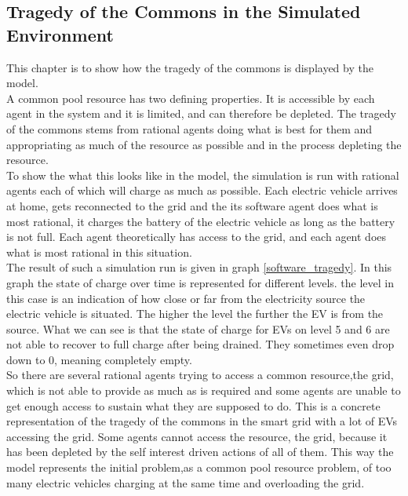 \documentclass[a4paper]{article}
\begin{document}
\subsection{Tragedy of the Commons in the Simulated Environment}
This chapter is to show how 
the tragedy of the commons is displayed by the model. \\
A common pool resource has two defining properties. It is accessible by each agent in the system and it is limited, and can 
therefore be depleted. The tragedy of the commons stems from rational agents doing what is best for them and 
appropriating as much of the resource as possible and in the process depleting the resource. \\
To show the what this looks like in the model, the simulation is run with rational agents each of which will charge 
as much as possible. Each electric vehicle arrives at home, gets reconnected to the grid and the its software agent 
does what is most rational, it charges the battery of the electric vehicle as long as the battery is not full. Each agent theoretically 
has access to the grid, and each agent does what is most rational in this situation. \\
The result of such a simulation run is given in graph \ref{software_tragedy}. In this graph the state of charge over 
time is 
represented for different levels. the level in this case is an indication of how close or far from the 
electricity source the electric vehicle is situated. The higher the level the further the EV is from the source. 
What we can see is that the state of charge for EVs on level 5 and 6 are not able to recover to full charge after being 
drained. They sometimes even drop down to 0, meaning completely empty.\\
So there are several rational agents trying to access a common resource,the grid, which is not able to provide as much 
as is required and some agents are unable to get enough access to sustain what they are supposed to do.
This is a concrete
representation of the tragedy of the commons in the smart grid with a lot of EVs accessing the grid. Some agents 
cannot access the resource, the grid, because it has been depleted by the self interest driven actions of 
all of them. This way the model represents the initial problem,as a common pool resource problem, 
of too many electric vehicles charging at the same time and overloading the grid. 
\end{document}
